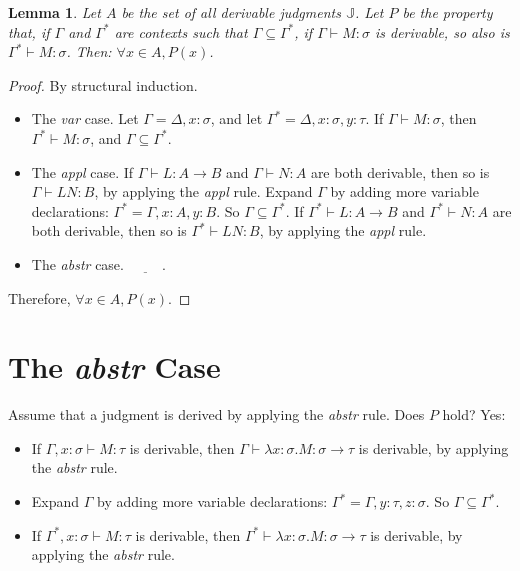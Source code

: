 \documentclass{book}
\numberwithin{equation}{chapter}
\newcommand{\blank}{\underline{\hspace{1cm}}}
\newtheorem*{anon-lemma}{Lemma}
\begin{document}
\noindent
\hrulefill

\begin{anon-lemma}
Let $A$ be the set of all derivable judgments $\mathbb{J}$. Let $P$ be the property that, if $\Gamma$ and $\Gamma^{*}$ are contexts such that $\Gamma \subseteq \Gamma^{*}$, if $\Gamma \vdash M : \sigma$ is derivable, so also is $\Gamma^{*} \vdash M : \sigma$. Then: $\forall x \in A, P(x)$.
\end{anon-lemma}

\begin{proof}
By structural induction.

\begin{itemize}
\item{The \textit{var} case. Let $\Gamma = \Delta, x : \sigma$, and let $\Gamma^{*} = \Delta, x : \sigma, y : \tau$. If $\Gamma \vdash M : \sigma$, then $\Gamma^{*} \vdash M : \sigma$, and $\Gamma \subseteq \Gamma^{*}$.}

\item{The \textit{appl} case. If $\Gamma \vdash L : A \rightarrow B$ and $\Gamma \vdash N : A$ are both derivable, then so is $\Gamma \vdash LN : B$, by applying the \textit{appl} rule. Expand $\Gamma$ by adding more variable declarations: $\Gamma^{*} = \Gamma, x : A, y : B$.  So $\Gamma \subseteq \Gamma^{*}$. If $\Gamma^{*} \vdash L : A \rightarrow B$ and $\Gamma^{*} \vdash N : A$ are both derivable, then so is $\Gamma^{*} \vdash LN : B$, by applying the \textit{appl} rule.}

\item{The \textit{abstr} case. $\blank$.}
\end{itemize}

\noindent
Therefore, $\forall x \in A, P(x)$.
\end{proof}

\noindent
\hrulefill
\newline


\section{The \textit{abstr} Case}

Assume that a judgment is derived by applying the \textit{abstr} rule. Does $P$ hold? Yes:

\begin{itemize}
\item{If $\Gamma, x : \sigma \vdash M : \tau$ is derivable, then $\Gamma \vdash \lambda x : \sigma.M : \sigma \rightarrow \tau$ is derivable, by applying the \textit{abstr} rule.}
\item{Expand $\Gamma$ by adding more variable declarations: $\Gamma^{*} = \Gamma, y : \tau, z : \sigma$. So $\Gamma \subseteq \Gamma^{*}$.}
\item{If $\Gamma^{*}, x : \sigma \vdash M : \tau$ is derivable, then $\Gamma^{*} \vdash \lambda x : \sigma.M : \sigma \rightarrow \tau$ is derivable, by applying the \textit{abstr} rule.}
\end{itemize}
\end{document}
